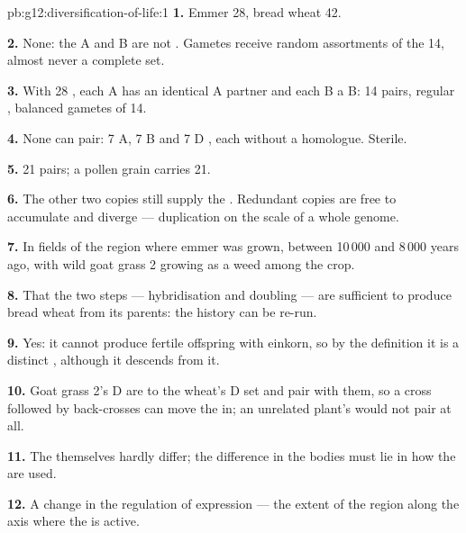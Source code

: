 \begin{solution}{pb:g12:diversification-of-life:1}
\textbf{1.} Emmer 28, bread wheat 42.

\textbf{2.} None: the A and B  are not . Gametes
receive random assortments of the 14, almost never a complete set.

\textbf{3.} With 28 , each A has an identical A partner and
each B a B: 14 pairs, regular , balanced gametes of 14.

\textbf{4.} None can pair: 7 A, 7 B and 7 D , each without
a homologue. Sterile.

\textbf{5.} 21 pairs; a pollen grain carries 21.

\textbf{6.} The other two copies still supply the . Redundant
copies are free to accumulate  and diverge --- duplication on
the scale of a whole genome.

\textbf{7.} In fields of the region where emmer was grown, between
10\,000 and 8\,000 years ago, with wild goat grass 2 growing as a weed
among the crop.

\textbf{8.} That the two steps --- hybridisation and doubling --- are
sufficient to produce bread wheat from its parents: the history can
be re-run.

\textbf{9.} Yes: it cannot produce fertile offspring with einkorn, so
by the definition it is a distinct , although it descends from
it.

\textbf{10.} Goat grass 2's D  are  to the wheat's
D set and pair with them, so a cross followed by back-crosses can move
the  in; an unrelated plant's  would not pair at all.

\textbf{11.} The  themselves hardly differ; the difference in the
bodies must lie in how the  are used.

\textbf{12.} A change in the regulation of expression --- the extent
of the region along the axis where the  is active.


\end{solution}
